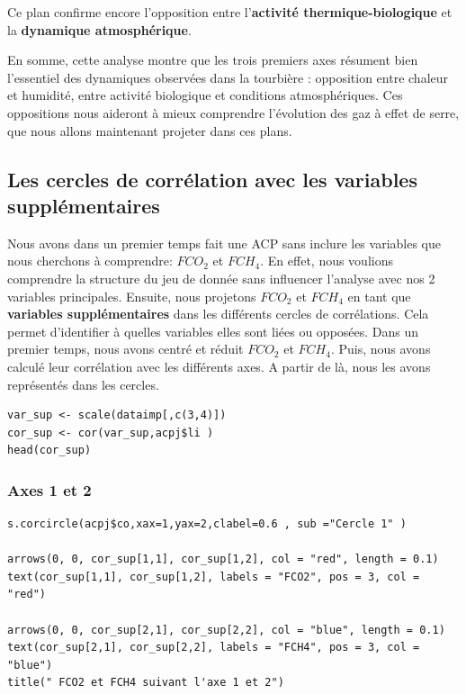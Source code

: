 \documentclass[a4paper,12pt]{report}%
\begin{document}
Ce plan confirme encore l’opposition entre l’\textbf{activité thermique-biologique} et la \textbf{dynamique atmosphérique}. \newline

En somme, cette analyse montre que les trois premiers axes résument bien l’essentiel des dynamiques observées dans la tourbière : opposition entre chaleur et humidité, entre activité biologique et conditions atmosphériques. Ces oppositions nous aideront à mieux comprendre l’évolution des gaz à effet de serre, que nous allons maintenant projeter dans ces plans.

\subsection{Les cercles de corrélation avec les variables supplémentaires}

Nous avons dans un premier temps fait une ACP sans inclure les variables que nous cherchons à comprendre:  $FCO_2$ et $FCH_4$. 
En effet, nous voulions comprendre la structure du jeu de donnée sans influencer l'analyse avec nos 2 variables principales. Ensuite, nous projetons $FCO_2$ et $FCH_4$ en tant que \textbf{variables supplémentaires} dans les différents cercles de corrélations. Cela permet d'identifier à  quelles variables  elles sont liées ou opposées.
Dans un premier temps, nous avons centré et réduit $FCO_2$ et $FCH_4$. Puis, nous avons calculé leur corrélation avec les différents axes. A partir de là, nous les avons représentés dans les cercles.

\begin{lstlisting}
var_sup <- scale(dataimp[,c(3,4)])  
cor_sup <- cor(var_sup,acpj$li )
head(cor_sup)
\end{lstlisting}

\subsubsection{Axes 1 et 2 }

\begin{lstlisting}
s.corcircle(acpj$co,xax=1,yax=2,clabel=0.6 , sub ="Cercle 1" ) 

arrows(0, 0, cor_sup[1,1], cor_sup[1,2], col = "red", length = 0.1)  
text(cor_sup[1,1], cor_sup[1,2], labels = "FCO2", pos = 3, col = "red")

arrows(0, 0, cor_sup[2,1], cor_sup[2,2], col = "blue", length = 0.1)
text(cor_sup[2,1], cor_sup[2,2], labels = "FCH4", pos = 3, col = "blue")
title(" FCO2 et FCH4 suivant l'axe 1 et 2")
\end{lstlisting}
\end{document}
